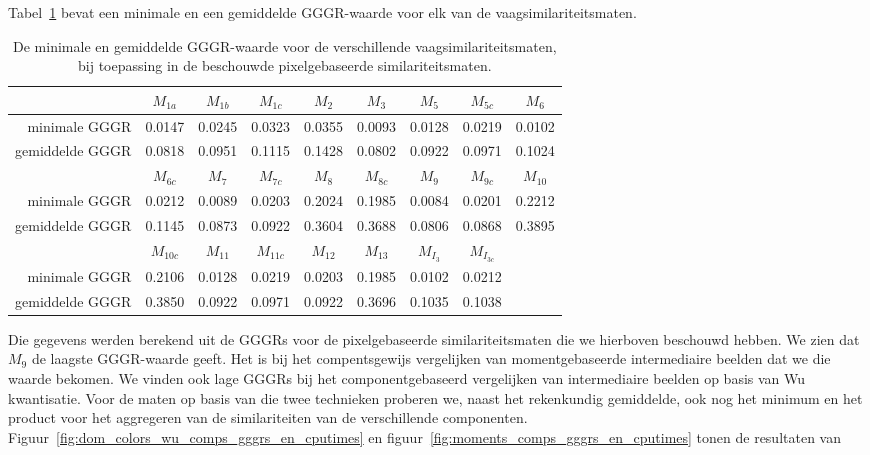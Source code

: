 Tabel~\ref{tab:stat_gegevens_pixelgeb_maten} bevat een minimale en een gemiddelde 
GGGR-waarde voor elk van de vaagsimilariteitsmaten.
\begin{table}[!b]
\vspace{10pt}
\centering
\small
\begin{tabular}{r|cccccccc}
& $M_{1a}$ & $M_{1b}$ & $M_{1c}$ & $M_{2}$ & $M_{3}$ & $M_{5}$ & $M_{5c}$ & $M_{6}$ \\
\hline
minimale GGGR & 0.0147 & 0.0245 & 0.0323 & 0.0355 & 0.0093 & 0.0128 & 0.0219 & 0.0102 \\
gemiddelde GGGR & 0.0818 & 0.0951 & 0.1115 & 0.1428 & 0.0802 & 0.0922 & 0.0971 & 0.1024\vspace{8pt}\\
& $M_{6c}$ & $M_{7}$ & $M_{7c}$ & $M_{8}$ & $M_{8c}$ & $M_{9}$ & $M_{9c}$ & $M_{10}$ \\
\hline
minimale GGGR & 0.0212 & 0.0089 & 0.0203 & 0.2024 & 0.1985 & 0.0084 & 0.0201 & 0.2212 \\
gemiddelde GGGR & 0.1145 & 0.0873 & 0.0922 & 0.3604 & 0.3688 & 0.0806 & 0.0868 & 0.3895\vspace{8pt}\\
& $M_{10c}$ & $M_{11}$ & $M_{11c}$ & $M_{12}$ & $M_{13}$ & $M_{I_3}$ & $M_{I_{3c}}$ \\
\hline
minimale GGGR & 0.2106 & 0.0128 & 0.0219 & 0.0203 & 0.1985 & 0.0102 & 0.0212 \\
gemiddelde GGGR & 0.3850 & 0.0922 & 0.0971 & 0.0922 & 0.3696 & 0.1035 & 0.1038
\end{tabular}
\vspace{10pt}
\caption{\label{tab:stat_gegevens_pixelgeb_maten}De minimale en gemiddelde GGGR-waarde voor 
de verschillende vaagsimilariteitsmaten, bij toepassing in de beschouwde pixelgebaseerde 
similariteitsmaten.}
\end{table}
Die gegevens werden berekend uit de GGGRs voor de pixelgebaseerde similariteitsmaten
die we hierboven beschouwd hebben. We zien dat $M_9$ de laagste GGGR-waarde geeft. Het is
bij het compentsgewijs vergelijken van momentgebaseerde intermediaire beelden dat we
die waarde bekomen. We vinden ook lage GGGRs bij het componentgebaseerd vergelijken van 
intermediaire beelden op basis van Wu kwantisatie. Voor de maten op basis van
die twee technieken proberen we, naast 
het rekenkundig gemiddelde, ook nog het minimum en het product voor het aggregeren 
van de similariteiten van de verschillende componenten. Figuur~\ref{fig:dom_colors_wu_comps_gggrs_en_cputimes}
en figuur~\ref{fig:moments_comps_gggrs_en_cputimes} tonen de resultaten van
